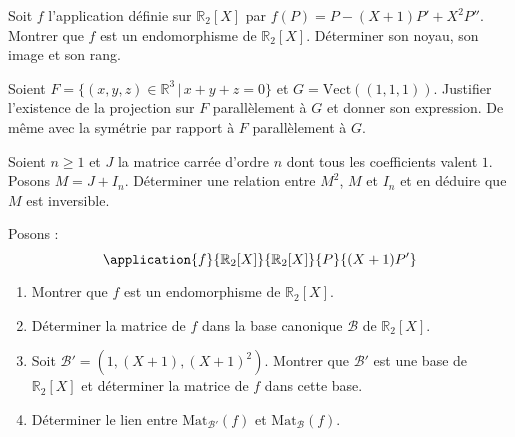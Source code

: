 \documentclass[twoside,a4paper,french,10pt]{VcCours}
\begin{document}
\begin{Exercice}
    Soit $f$ l'application définie sur $\mathbb{R}_2[X]$ par $f(P)=P-(X+1)P'+X^2 P''$. Montrer que $f$ est un endomorphisme de $\mathbb{R}_2[X]$. Déterminer son noyau, son image et son rang.
\end{Exercice} 

\begin{Exercice}
    Soient $F= \lbrace (x,y,z) \in \mathbb{R}^3 \, \vert \, x+y+z =0 \rbrace$ et $G= \textrm{Vect}((1,1,1))$. Justifier l'existence de la projection sur $F$ parallèlement à $G$ et donner son expression. De même avec la symétrie par rapport à $F$ parallèlement à $G$. 
\end{Exercice} 

\begin{Exercice}
    Soient $n \geq 1$ et $J$ la matrice carrée d'ordre $n$ dont tous les coefficients valent $1$. Posons $M=J+ I_n$. Déterminer une relation entre $M^2$, $M$ et $I_n$ et en déduire que $M$ est inversible.
\end{Exercice} 

\begin{Exercice}
    Posons :
    $$ \application{f}{\mathbb{R}_2[X]}{\mathbb{R}_2[X]}{P}{(X+1)P'}$$

    \begin{enumerate}
    \item Montrer que $f$ est un endomorphisme de $ \mathbb{R}_2[X]$.
    \item Déterminer la matrice de $f$ dans la base canonique $\mathcal{B}$ de $\mathbb{R}_2[X]$.
    \item Soit $\mathcal{B}'= (1, (X+1),(X+1)^2)$. Montrer que $\mathcal{B}'$ est une base de $\mathbb{R}_2[X]$ et déterminer la matrice de $f$ dans cette base.
    \item Déterminer le lien entre $\textrm{Mat}_{\mathcal{B}'}(f)$ et $\textrm{Mat}_{\mathcal{B}}(f)$.
    \end{enumerate}
\end{Exercice} 
\end{document}
